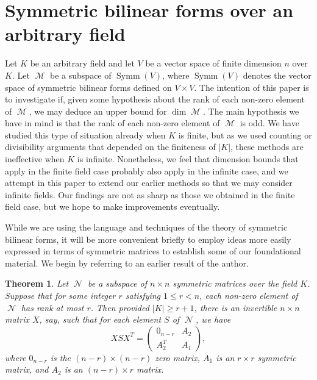 \documentclass{amsart}
\DeclareMathOperator{\M}{\mathcal{M}}
\DeclareMathOperator{\N}{\mathcal{N}}
\DeclareMathOperator{\Symm}{Symm}
\theoremstyle{plain}
\newtheorem{theorem}{Theorem}
\theoremstyle{definition}
\begin{document}
\section{Symmetric bilinear forms over an arbitrary field}

\noindent Let $K$ be an arbitrary field and let $V$ be a vector space of finite dimension $n$ over $K$. 
Let $\M$ be a subspace of $\Symm(V)$, where
$\Symm(V)$ 	
denotes the 
vector space of symmetric bilinear forms defined on $V\times V$.
The 
intention of this paper is to investigate if, given some hypothesis about the rank of each non-zero element of $\M$, we may
deduce an upper bound for $\dim \M$. The main hypothesis we have in mind is that the rank of each non-zero element of
$\M$ is odd. We have studied this type of situation already when $K$ is finite, but as we used counting
or divisibility arguments that depended on the finiteness of $|K|$, these methods are ineffective when $K$ is infinite. Nonetheless, we feel
that dimension bounds that apply in the finite field case probably also apply in the infinite case, and we attempt in this paper 
to extend our earlier methods so that we may consider infinite fields. Our findings are not as sharp as
those we obtained in the finite field case, but we hope to make improvements eventually.

While we are using the language and techniques of the theory of symmetric bilinear forms, it will be more convenient
briefly to employ ideas more easily expressed in terms of symmetric matrices to establish some of our foundational material. We begin
by referring to an earlier result of the author.

\begin{theorem} \label{common_zeros}
Let $\N$ be a subspace of $n\times n$ symmetric matrices over the field $K$.
Suppose that for some integer $r$ satisfying $1\leq r<n$, each non-zero element of $\N$ has rank at most $r$.
Then provided $|K|\geq r+1$, there is an invertible $n\times n$ matrix $X$, say, such that for each element $S$ of $\N$, we
have
\[
 XSX^T=\left(
\begin{array}
{cc}
        0_{n-r}&A_2\\
        A_2^T&A_1  
\end{array}
\right),
\] 
where $0_{n-r}$ is the $(n-r) \times (n-r)$ zero matrix, $A_1$ is an $r\times r$ symmetric matrix, 
and $A_2$ is an $(n-r)\times r$ matrix.


 
\end{theorem}
\end{document}
